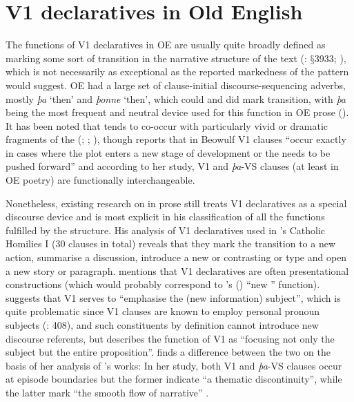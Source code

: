 \documentclass[output=paper,colorlinks,citecolor=brown]{langscibook}
\begin{document}
\section{V1 declaratives in Old English}\label{sec:cichosz:2}

\noindent The functions of V1 declaratives in OE are usually quite broadly defined as marking some sort of transition in the narrative structure of the text (\citealt{Mitchell1985}: $§$3933; \citealt{Calle-MartínMiranda-García2010}), which is not necessarily as exceptional as the reported markedness of the pattern would suggest. OE had a large set of clause-initial discourse-sequencing adverbs, mostly \textit{þa} ‘then' and \textit{þonne} ‘then', which could and did mark transition, with \textit{þa} being the most frequent and neutral device used for this function in OE prose (\citealt{vanKem-Los2006}). It has been noted that  tends to co{}-occur with particularly vivid or dramatic fragments of the  (\citealt[291]{Stockwell1977}; \citealt[163]{Kiparsky1995}; \citealt{Los2000}), though \citet[168]{Petrova2006} reports that in Beowulf V1 clauses “occur exactly in cases where the plot enters a new stage of development or the  needs to be pushed forward” and according to her study, V1 and \textit{þa}-VS clauses (at least in OE poetry) are functionally interchangeable.

Nonetheless, existing research on  in prose still treats V1 declaratives as a special discourse device and \citet{Ohkado2004} is most explicit in his classification of all the functions fulfilled by the structure. His analysis of V1 declaratives used in 's Catholic Homilies I (30 clauses in total) reveals that they mark the transition to a new action, summarise a discussion, introduce a new or contrasting  or type and open a new story or paragraph. \citet[$§$3930]{Mitchell1985} mentions that V1 declaratives are often presentational constructions (which would probably correspond to \citeauthor{Ohkado2004}'s (\citeyear{Ohkado2004}) “new ” function). \citet[34]{Allen1995} suggests that V1 serves to “emphasise the (new information) subject”, which is quite problematic since V1 clauses are known to employ personal pronoun subjects (\citealt{RingeTaylor2014}: 408), and such constituents by definition cannot introduce new discourse referents, but \citet[171]{Petrova2006} describes the function of V1 as “focusing not only the subject but the entire proposition”. \citet{Los2000} finds a difference between the two on the basis of her analysis of 's works: In her study, both V1 and \textit{þa}{}-VS clauses occur at episode boundaries but the former indicate “a thematic discontinuity”, while the latter mark “the smooth flow of narrative” \citep[263]{Los2000}.
\end{document}
